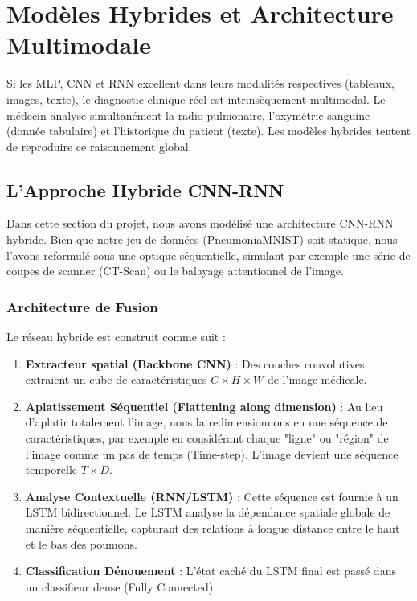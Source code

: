 \documentclass[a4paper,12pt]{report}
\begin{document}
\chapter{Modèles Hybrides et Architecture Multimodale}

Si les MLP, CNN et RNN excellent dans leurs modalités respectives (tableaux, images, texte), le diagnostic clinique réel est intrinsèquement multimodal. Le médecin analyse simultanément la radio pulmonaire, l'oxymétrie sanguine (donnée tabulaire) et l'historique du patient (texte). Les modèles hybrides tentent de reproduire ce raisonnement global.

\section{L'Approche Hybride CNN-RNN}
Dans cette section du projet, nous avons modélisé une architecture CNN-RNN hybride. Bien que notre jeu de données (PneumoniaMNIST) soit statique, nous l'avons reformulé sous une optique séquentielle, simulant par exemple une série de coupes de scanner (CT-Scan) ou le balayage attentionnel de l'image.

\subsection{Architecture de Fusion}
Le réseau hybride est construit comme suit :
\begin{enumerate}
    \item \textbf{Extracteur spatial (Backbone CNN)} : Des couches convolutives extraient un cube de caractéristiques $C \times H \times W$ de l'image médicale.
    \item \textbf{Aplatissement Séquentiel (Flattening along dimension)} : Au lieu d'aplatir totalement l'image, nous la redimensionnons en une séquence de caractéristiques, par exemple en considérant chaque "ligne" ou "région" de l'image comme un pas de temps (Time-step). L'image devient une séquence temporelle $T \times D$.
    \item \textbf{Analyse Contextuelle (RNN/LSTM)} : Cette séquence est fournie à un LSTM bidirectionnel. Le LSTM analyse la dépendance spatiale globale de manière séquentielle, capturant des relations à longue distance entre le haut et le bas des poumons.
    \item \textbf{Classification Dénouement} : L'état caché du LSTM final est passé dans un classifieur dense (Fully Connected).
\end{enumerate}
\end{document}
